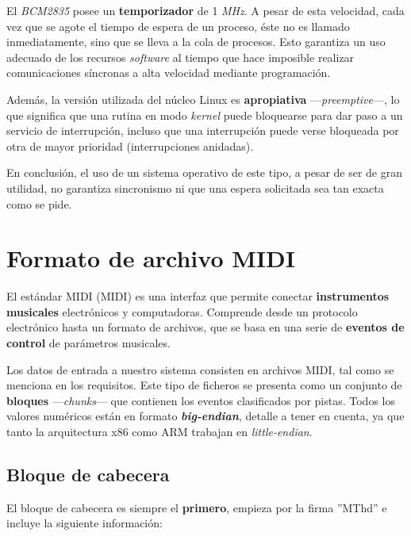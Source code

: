 El \textit{BCM2835} posee un \textbf{temporizador} de 1 \textit{MHz}. A pesar de esta velocidad, cada vez que se agote el tiempo de espera de un proceso, éste no es llamado inmediatamente, sino que se lleva a la cola de procesos. Esto garantiza un uso adecuado de los recursos \textit{software} al tiempo que hace imposible realizar comunicaciones síncronas a alta velocidad mediante programación.

Además, la versión utilizada del núcleo Linux es \textbf{apropiativa} ---\textit{preemptive}---, lo que significa que una rutina en modo \textit{kernel} puede bloquearse para dar paso a un servicio de interrupción, incluso que una interrupción puede verse bloqueada por otra de mayor prioridad (interrupciones anidadas).

En conclusión, el uso de un sistema operativo de este tipo, a pesar de ser de gran utilidad, no garantiza sincronismo ni que una espera solicitada sea tan exacta como se pide.

\section{Formato de archivo MIDI}
\label{sec:fmto_midi}

El estándar \acrshort{MIDI} (\acrlong{MIDI}) es una interfaz que permite conectar \textbf{instrumentos musicales} electrónicos y computadoras. Comprende desde un protocolo electrónico hasta un formato de archivos, que se basa en una serie de \textbf{eventos de control} de parámetros musicales. \cite{wiki_midi}

Los datos de entrada a nuestro sistema consisten en archivos \acrshort{MIDI}, tal como se menciona en los requisitos. Este tipo de ficheros se presenta como un conjunto de \textbf{bloques} ---\textit{chunks}--- que contienen los eventos clasificados por pistas. Todos los valores numéricos están en formato \textbf{\textit{big-endian}}, detalle a tener en cuenta, ya que tanto la arquitectura x86 como ARM trabajan en \textit{little-endian}. \cite{midi}

\subsection{Bloque de cabecera}

El bloque de cabecera es siempre el \textbf{primero}, empieza por la firma ''MThd'' e incluye la siguiente información:

\smallskip

